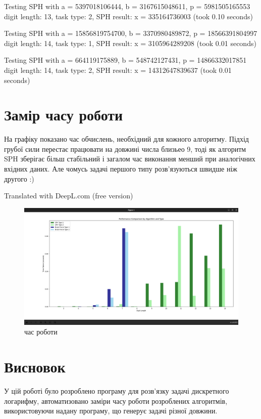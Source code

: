 \documentclass{article}
\begin{document}
Testing SPH with a = 5397018106444, b = 3167615048611, p = 5981505165553
digit length: 13, task type: 2, SPH result: x = 335164736003 (took 0.10 seconds)

Testing SPH with a = 15856819754700, b = 3370980489872, p = 18566391804997
digit length: 14, task type: 1, SPH result: x = 3105964289208 (took 0.01 seconds)

Testing SPH with a = 664119175889, b = 548742127431, p = 14866332017851
digit length: 14, task type: 2, SPH result: x = 14312647839637 (took 0.01 seconds)

\section{Замір часу роботи}
\quad На графіку показано час обчислень, необхідний для кожного алгоритму. Підхід грубої сили перестає працювати на довжині числа близьео 9, тоді як алгоритм SPH зберігає більш стабільний і загалом час виконання менший при аналогічних вхідних даних. Але чомусь задачі першого типу розв'язуються швидше ніж другого :)

Translated with DeepL.com (free version)
\begin{figure}[htbp]
    \centering
    \includegraphics[width=1.0\textwidth]{time.png}
    \caption{час роботи}
    \label{fig:screenshot}
\end{figure}

\section{Висновок}
\quad
У цій роботі було розроблено програму для розв'язку задачі дискретного логарифму, автоматизовано заміри часу роботи розроблених алгоритмів, використовуючи надану програму, що генерує задачі різної довжини.
\end{document}
